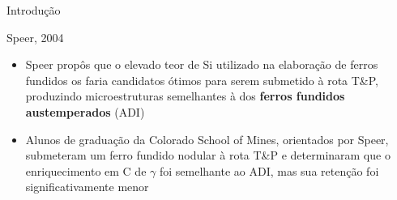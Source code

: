 %

\begin{frame}{Introdução}
  \begin{block}{Speer, 2004\footnotemark[1]}
    \begin{itemize}
    \item Speer propôs que o elevado teor de Si utilizado na elaboração de ferros fundidos os faria candidatos ótimos para serem submetido à rota T\&P, produzindo microestruturas semelhantes à dos \textbf{ferros fundidos austemperados} (ADI)
    \item Alunos de graduação da Colorado School of Mines, orientados por Speer, submeteram um ferro fundido nodular à rota T\&P e determinaram que o enriquecimento em C de $\gamma$ foi semelhante ao ADI, mas sua retenção foi significativamente menor
    \end{itemize}
  \end{block}


\end{frame}


